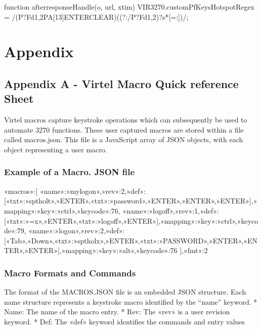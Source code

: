 \documentclass[letterpaper,10pt,english]{sphinxmanual}
\begin{document}
\begin{sphinxVerbatim}[commandchars=\\\{\}]
function after\PYGZus{}responseHandle(o, url, xtim) \PYGZob{}
VIR3270.customPfKeysHotspotRegex = /(P?F\PYGZbs{}d\PYGZob{}1,2\PYGZcb{}\textbar{}PA[1\PYGZhy{}3]\textbar{}ENTER\textbar{}CLEAR)((?:\PYGZbs{}/P?F\PYGZbs{}d\PYGZob{}1,2\PYGZcb{})?\PYGZbs{}s*[=:\PYGZhy{}])/;
\PYGZcb{}
\end{sphinxVerbatim}


\chapter{Appendix}
\label{\detokenize{Customization:appendix}}

\section{Appendix A - Virtel Macro Quick reference Sheet}
\label{\detokenize{Customization:appendix-a-virtel-macro-quick-reference-sheet}}
Virtel macros capture keystroke operations which can subsequently be used to automate 3270 functions.
These user captured macros are stored within a file called macros.json. This file is a JavaScript array of JSON objects, with each object representing a user
macro.


\subsection{Example of a Macro. JSON file}
\label{\detokenize{Customization:example-of-a-macro-json-file}}
\begin{sphinxVerbatim}[commandchars=\\\{\}]
\PYGZob{}«macros»:[
\PYGZob{}«name»:»mylogon»,»rev»:2,»def»:[\PYGZob{}«txt»:»sptholt»\PYGZcb{},»ENTER»,\PYGZob{}«txt»:»password»\PYGZcb{},»ENTER»,»ENTER»,»ENTER»],»mapping»:\PYGZob{}«key»:»ctrl»,»keycode»:76\PYGZcb{}\PYGZcb{},
\PYGZob{}«name»:»logoff»,»rev»:1,»def»:[\PYGZob{}«txt»:»=x»\PYGZcb{},»ENTER»,\PYGZob{}«txt»:»logoff»\PYGZcb{},»ENTER»],»mapping»:\PYGZob{}«key»:»ctrl»,»keycode»:79\PYGZcb{}\PYGZcb{},
\PYGZob{}«name»:»logon»,»rev»:2,»def»:[«Tab»,»Down»,\PYGZob{}«txt»:»sptholx»\PYGZcb{},»ENTER»,\PYGZob{}«txt»:»PASSWORD»\PYGZcb{},»ENTER»,»ENTER»,»ENTER»],»mapping»:\PYGZob{}«key»:»alt»,»keycode»:76\PYGZcb{}\PYGZcb{}
],»fmt»:2\PYGZcb{}
\end{sphinxVerbatim}


\subsection{Macro Formats and Commands}
\label{\detokenize{Customization:id2}}
The format of the MACROS.JSON file is an embedded JSON structure. Each name structure represents a keystroke macro identified by the “name” keyword.
* Name: The name of the macro entry.
* Rev: The «rev» is a user revision keyword.
* Def: The «def» keyword identifies the commands and entry values
\end{document}
